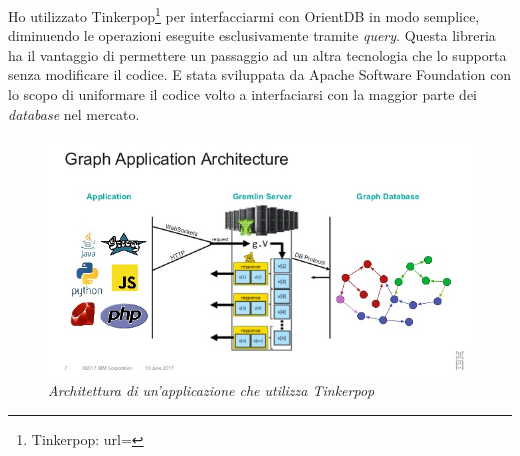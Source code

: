 Ho utilizzato Tinkerpop\footnote{Tinkerpop: url= } per interfacciarmi con OrientDB in modo semplice, diminuendo le operazioni eseguite esclusivamente tramite \textit{query}. Questa libreria ha il vantaggio di permettere un passaggio ad un altra tecnologia che lo supporta senza modificare il codice. E stata sviluppata da Apache Software Foundation con lo scopo di uniformare il codice volto a interfaciarsi con la maggior parte dei \textit{database} nel mercato.
\begin{figure}[h!]
	\centering
	\includegraphics[scale=0.65]{immagini/tinkerpop.jpg}
	\caption{\textit{Architettura di un'applicazione che utilizza Tinkerpop} }
\end{figure}

